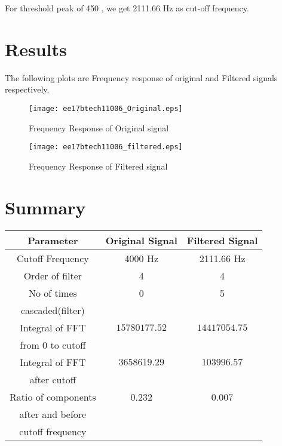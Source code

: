 \documentclass[journal,12pt,twocolumn]{IEEEtran}
\begin{document}
    For threshold peak of 450 , we get 2111.66 Hz as cut-off frequency.
   \section{\textbf{Results}}
   The following plots are Frequency response of original and Filtered signals respectively.
     
\begin{figure}[!h]
	\centering
	\texttt{[image: ee17btech11006\_Original.eps]}
	\caption{Frequency Response of Original signal}
	\label{fig:Figure1}
\end{figure} 

\begin{figure}[!h]
	\centering
	\texttt{[image: ee17btech11006\_filtered.eps]}
	\caption{Frequency Response of Filtered signal}
	\label{fig:Figure2}
\end{figure} 


    \section{\textbf{Summary}} 
 \begin{center}
 	\begin{tabular}{ |c|c|c| } 
 		\hline
 		Parameter & Original Signal & Filtered Signal \\
 		\hline
 		Cutoff Frequency & 4000 Hz & 2111.66 Hz \\ 
 		\hline
 		Order of filter & 4 & 4 \\
 		\hline
 		No of times  & 0 & 5 \\
 		 cascaded(filter) &  & \\
 		\hline
 		Integral of FFT & $15780177.52$ & $14417054.75$\\
 		from 0 to cutoff &  & \\
 		\hline
 		Integral of FFT & $3658619.29$ & $103996.57$\\
 		after cutoff &  & \\
 		\hline
 		Ratio of components & 0.232 & 0.007\\
 		after and before &  & \\
 		cutoff frequency &  & \\
 		\hline
 	\end{tabular}
 \end{center}

	
	
\end{document}
